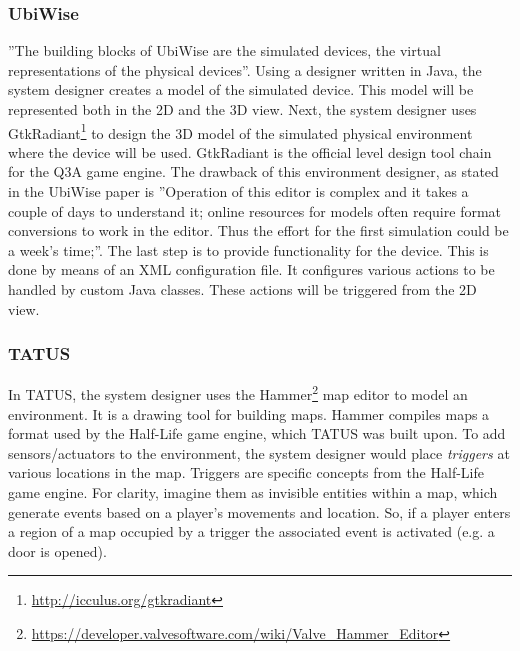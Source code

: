 \subsubsection{UbiWise} %
''The building blocks of UbiWise are the simulated devices, the virtual representations of the physical devices''\cite{barton2003ubiwise}. Using a designer written in Java, the system designer creates a model of the simulated device. This model will be represented both in the 2D and the 3D view. Next, the system designer uses GtkRadiant\footnote{\url{http://icculus.org/gtkradiant}} to design the 3D model of the simulated physical environment where the device will be used. GtkRadiant is the official level design tool chain for the Q3A game engine. The drawback of this environment designer, as stated in the UbiWise paper is ''Operation of this editor is complex and it takes a couple of days to understand it; online resources for models often require format conversions to work in the editor. Thus the effort for the first simulation could be a week's time;''\cite{barton2003ubiwise}. The last step is to provide functionality for the device. This is done by means of an XML configuration file. It configures various actions to be handled by custom Java classes. These actions will be triggered from the 2D view.\\

\subsubsection{TATUS} %
In TATUS, the system designer uses the Hammer\footnote{\url{https://developer.valvesoftware.com/wiki/Valve_Hammer_Editor}} map editor to model an environment. It is a drawing tool for building maps. Hammer compiles maps a format used by the Half-Life game engine, which TATUS was built upon. To add sensors/actuators to the environment, the system designer would place \emph{triggers} at various locations in the map. Triggers are specific concepts from the Half-Life game engine. For clarity, imagine them as invisible entities within a map, which generate events based on a player's movements and location. So, if a player enters a region of a map occupied by a trigger the associated event is activated (e.g. a door is opened).\\

